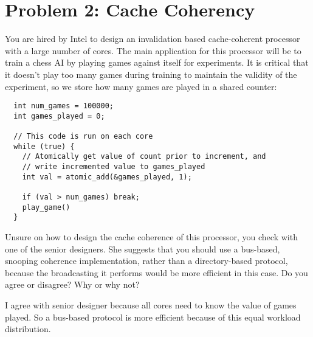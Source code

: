 \documentclass[11pt]{article}
\newenvironment{answer}{\begin{minipage}[c][1.5in]{\textwidth}}{\end{minipage}}
\begin{document}
\section*{Problem 2: Cache Coherency}
You are hired by Intel to design an invalidation based cache-coherent processor with a large number of cores.
The 
  main application for this processor will be to train a chess AI by playing games against itself for experiments. It is critical that it
  doesn't play too many games during training to maintain the validity of the experiment, so we store how many
  games are played in a shared counter:
  \begin{lstlisting}
  int num_games = 100000;
  int games_played = 0;

  // This code is run on each core
  while (true) {
    // Atomically get value of count prior to increment, and
    // write incremented value to games_played
    int val = atomic_add(&games_played, 1);   

    if (val > num_games) break;
    play_game()
  }
  \end{lstlisting}

  Unsure on how to design the cache coherence of this processor, you check with one of the senior designers. She suggests that you 
  should use a bus-based, snooping coherence implementation, rather than a directory-based protocol, because 
 the broadcasting it performs would be more
  efficient in this case. Do you agree or disagree? Why or why not?

\begin{answer}
I agree with senior designer because all cores need to know the value of games played. 
So a bus-based protocol is more efficient because of this equal workload distribution.
\end{answer}
\end{document}
